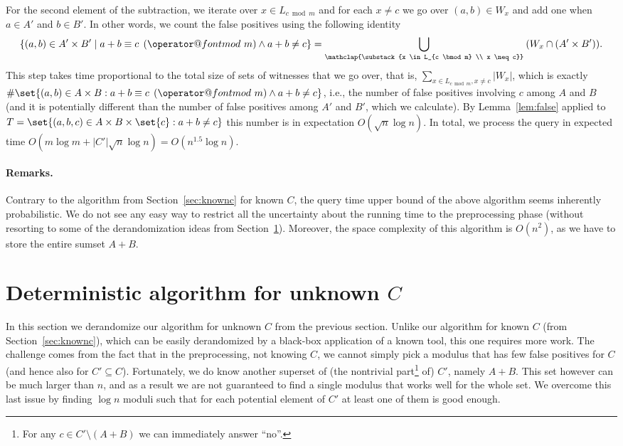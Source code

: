 \documentclass[10pt,a4paper]{article}
\makeatletter
\newcommand{\tpmod}[1]{\mkern 8mu({\operator@font mod}\mkern 6mu#1)}
\makeatother
\begin{document}
For the second element of the subtraction, we iterate over $x \in L    _{c \bmod m}$ and for each $x \neq c$ we go over $(a,b) \in W_x$ and add one when $a \in A'$ and $b \in B'$. In other words, we count the false positives using the following identity
\[
\{(a,b) \in A' \times B' \mid a + b \equiv c \tpmod{m} \land a + b \neq c\}
= \bigcup_{\mathclap{\substack{x \in L_{c \bmod m} \\ x \neq c}}} \: (W_x \cap (A' \times B')).
\]
This step takes time proportional to the total size of sets of witnesses that we go over, that is, $\sum_{x \in L_{c \bmod m}, x \neq c} |W_x|$, which is exactly
$\#\set{(a, b) \in A \times B : a+b \equiv c \tpmod{m} \land a+b\neq c}$, i.e., the number of false positives involving $c$ among $A$ and $B$ (and it is potentially different than the number of false positives among $A'$ and $B'$, which we calculate). By Lemma~\ref{lem:false} applied to $T = \set{(a,b,c) \in A \times B \times \set{c} : a + b \neq c}$ this number is in expectation $O(\sqrt{n} \log n)$. In total, we process the query in expected time $O(m \log m + |C'|\sqrt{n}\log n) = O(n^{1.5}\log n)$.

\paragraph{Remarks.}
Contrary to the algorithm from Section~\ref{sec:knownc} for known $C$, the query time upper bound of the above algorithm seems inherently probabilistic. We do not see any easy way to restrict all the uncertainty about the running time to the preprocessing phase (without resorting to some of the derandomization ideas from Section~\ref{sec:unknowncdet}). Moreover, the space complexity of this algorithm is $O(n^2)$, as we have to store the entire sumset $A+B$.

\section{Deterministic algorithm for unknown \texorpdfstring{$C$}{C}}
\label{sec:unknowncdet}

In this section we derandomize our algorithm for unknown $C$ from the previous section. Unlike our algorithm for known $C$ (from Section~\ref{sec:knownc}), which can be easily derandomized by a black-box application of a known tool, this one requires more work. The challenge comes from the fact that in the preprocessing, not knowing $C$, we cannot simply pick a modulus that has few false positives for $C$ (and hence also for $C' \subseteq C$). Fortunately, we do know another superset of (the nontrivial part\footnote{For any $c\in C'\setminus (A+B)$ we can immediately answer ``no''.} of) $C'$, namely $A+B$. This set however can be much larger than $n$, and as a result we are not guaranteed to find a single modulus that works well for the whole set. We overcome this last issue by finding $\log n$ moduli such that for each potential element of $C'$ at least one of them is good enough.
\end{document}
